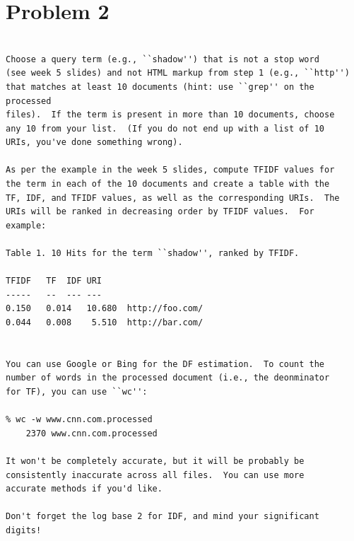 

\section{Problem 2}
\label{part2}
\begin{verbatim}

Choose a query term (e.g., ``shadow'') that is not a stop word
(see week 5 slides) and not HTML markup from step 1 (e.g., ``http'')
that matches at least 10 documents (hint: use ``grep'' on the processed
files).  If the term is present in more than 10 documents, choose
any 10 from your list.  (If you do not end up with a list of 10
URIs, you've done something wrong).

As per the example in the week 5 slides, compute TFIDF values for
the term in each of the 10 documents and create a table with the
TF, IDF, and TFIDF values, as well as the corresponding URIs.  The
URIs will be ranked in decreasing order by TFIDF values.  For
example:

Table 1. 10 Hits for the term ``shadow'', ranked by TFIDF.

TFIDF	TF	IDF	URI
-----	--	---	---
0.150	0.014	10.680	http://foo.com/
0.044	0.008	 5.510	http://bar.com/


You can use Google or Bing for the DF estimation.  To count the
number of words in the processed document (i.e., the deonminator
for TF), you can use ``wc'':

% wc -w www.cnn.com.processed
    2370 www.cnn.com.processed

It won't be completely accurate, but it will be probably be
consistently inaccurate across all files.  You can use more 
accurate methods if you'd like.  

Don't forget the log base 2 for IDF, and mind your significant
digits!

\end{verbatim}

